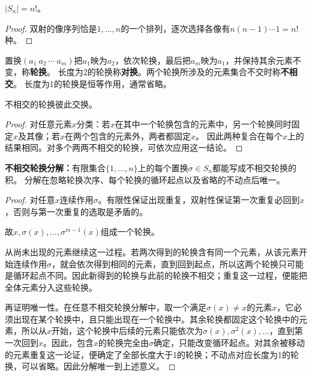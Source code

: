 \begin{proposition}
$|S_n|=n!$。
\end{proposition}
\begin{proof}
双射的像序列恰是$1,\ldots,n$的一个排列，逐次选择各像有$n(n-1)\cdots1=n!$种。
\end{proof}

\begin{definition}
置换$(a_1\ a_2\ \cdots\ a_m)$把$a_1$映为$a_2$，依次轮换，最后把$a_m$映为$a_1$，并保持其余元素不变，称\textbf{轮换}。
长度为2的轮换称\textbf{对换}。两个轮换所涉及的元素集合不交时称\textbf{不相交}。
长度为1的轮换是恒等作用，通常省略。
\end{definition}

\begin{proposition}
不相交的轮换彼此交换。
\end{proposition}
\begin{proof}
对任意元素$x$分类：若$x$在其中一个轮换包含的元素中，另一个轮换同时固定$x$及其像；若$x$在两个包含的元素外，两者都固定$x$。
因此两种复合在每个$x$上的结果相同。对多个两两不相交的轮换，可依次应用这一结论。
\end{proof}

\begin{theorem}
\textbf{不相交轮换分解：}有限集合$\{1,\ldots,n\}$上的每个置换$\sigma\in S_n$都能写成不相交轮换的积。
分解在忽略轮换次序、每个轮换的循环起点以及省略的不动点后唯一。
\end{theorem}
\begin{proof}
对任意$x$连续作用$\sigma$。有限性保证出现重复，双射性保证第一次重复必回到$x$，否则与第一次重复的选取是矛盾的。

故$x,\sigma(x),\ldots,\sigma^{m-1}(x)$组成一个轮换。

从尚未出现的元素继续这一过程。若两次得到的轮换含有同一个元素，从该元素开始连续作用$\sigma$，就会依次得到相同的元素，直到回到起点，所以这两个轮换只可能是循环起点不同。因此新得到的轮换与此前的轮换不相交；重复这一过程，便能把全体元素分入这些轮换。

再证明唯一性。在任意不相交轮换分解中，取一个满足$\sigma(x)\neq x$的元素$x$，它必须出现在某个轮换中，且只能出现在一个轮换中。其余轮换都固定这个轮换中的元素，所以从$x$开始，这个轮换中后续的元素只能依次为$\sigma(x),\sigma^2(x),\ldots$，直到第一次回到$x$。因此，包含$x$的轮换完全由$\sigma$确定，只能改变循环起点。对其余被移动的元素重复这一论证，便确定了全部长度大于1的轮换；不动点对应长度为1的轮换，可以省略。因此分解唯一到上述意义。
\end{proof}

